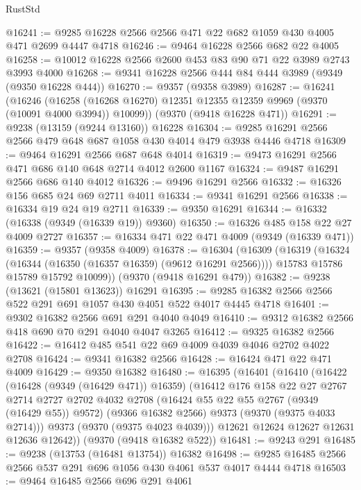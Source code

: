 \begin{lexlean}{RustStd}
\begin{coremodule}
@16241 := @9285 @16228 @2566 @2566 @471 @22 @682 @1059 @430 @4005 @471 @2699 @4447 @4718
@16246 := @9464 @16228 @2566 @682 @22 @4005
@16258 := @10012 @16228 @2566 @2600 @453 @83 @90 @71 @22 @3989 @2743 @3993 @4000
@16268 := @9341 @16228 @2566 @444 @84 @444 @3989 (@9349 (@9350 @16228 @444))
@16270 := @9357 (@9358 @3989)
@16287 := @16241
    (@16246 (@16258 (@16268 @16270) @12351 @12355 @12359 @9969 (@9370 (@10091 @4000 @3994)) @10099))
    (@9370 (@9418 @16228 @471))
@16291 := @9238 (@13159 (@9244 @13160)) @16228
@16304 := @9285 @16291 @2566 @2566 @479 @648 @687 @1058 @430 @4014 @479 @3938 @4446 @4718
@16309 := @9464 @16291 @2566 @687 @648 @4014
@16319 := @9473 @16291 @2566 @471 @686 @140 @648 @2714 @4012 @2600 @1167
@16324 := @9487 @16291 @2566 @686 @140 @4012
@16326 := @9496 @16291 @2566
@16332 := @16326 @156 @685 @24 @69 @2711 @4011
@16334 := @9341 @16291 @2566
@16338 := @16334 @19 @24 @19 @2711
@16339 := @9350 @16291
@16344 := @16332 (@16338 (@9349 (@16339 @19)) @9360)
@16350 := @16326 @485 @158 @22 @27 @4009 @2727
@16357 := @16334 @471 @22 @471 @4009 (@9349 (@16339 @471))
@16359 := @9357 (@9358 @4009)
@16378 := @16304
    (@16309
      (@16319
        (@16324 (@16344 (@16350 (@16357 @16359) (@9612 @16291 @2566))))
        @15783
        @15786
        @15789
        @15792
        @10099))
    (@9370 (@9418 @16291 @479))
@16382 := @9238 (@13621 (@15801 @13623)) @16291
@16395 := @9285 @16382 @2566 @2566 @522 @291 @691 @1057 @430 @4051 @522 @4017 @4445 @4718
@16401 := @9302 @16382 @2566 @691 @291 @4040 @4049
@16410 := @9312 @16382 @2566 @418 @690 @70 @291 @4040 @4047 @3265
@16412 := @9325 @16382 @2566
@16422 := @16412 @485 @541 @22 @69 @4009 @4039 @4046 @2702 @4022 @2708
@16424 := @9341 @16382 @2566
@16428 := @16424 @471 @22 @471 @4009
@16429 := @9350 @16382
@16480 := @16395
    (@16401
      (@16410
        (@16422
          (@16428 (@9349 (@16429 @471)) @16359)
          (@16412
            @176
            @158
            @22
            @27
            @2767
            @2714
            @2727
            @2702
            @4032
            @2708
            (@16424 @55 @22 @55 @2767 (@9349 (@16429 @55)) @9572)
            (@9366 @16382 @2566)
            @9373
            (@9370 (@9375 @4033 @2714)))
          @9373
          (@9370 (@9375 @4023 @4039)))
        @12621
        @12624
        @12627
        @12631
        @12636
        @12642))
    (@9370 (@9418 @16382 @522))
@16481 := @9243 @291
@16485 := @9238 (@13753 (@16481 @13754)) @16382
@16498 := @9285 @16485 @2566 @2566 @537 @291 @696 @1056 @430 @4061 @537 @4017 @4444 @4718
@16503 := @9464 @16485 @2566 @696 @291 @4061

\end{coremodule}
\end{lexlean}
